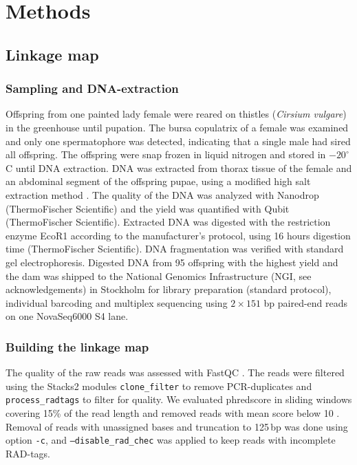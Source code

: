 \documentclass[twocolumn]{bmcart}%
\begin{document}
\section*{Methods}
\subsection*{Linkage map}
\subsubsection*{Sampling and DNA-extraction}
Offspring from one painted lady female were reared on thistles (\textit{Cirsium vulgare}) in the greenhouse until pupation. The bursa copulatrix of a female was examined and only one spermatophore was detected, indicating that a single male had sired all offspring. The offspring were snap frozen in liquid nitrogen and stored in $-20^\circ$C until DNA extraction. DNA was extracted from thorax tissue of the female and an abdominal segment of the offspring pupae, using a modified high salt extraction method \citep{aljanabiUniversalRapidSaltextraction1997}. The quality of the DNA was analyzed with Nanodrop (ThermoFischer Scientific) and the yield was quantified with Qubit (ThermoFischer Scientific). Extracted DNA was digested with the restriction enzyme EcoR1 according to the manufacturer's protocol, using 16 hours digestion time (ThermoFischer Scientific). DNA fragmentation was verified with standard gel electrophoresis. Digested DNA from 95 offspring with the highest yield and the dam was shipped to the National Genomics Infrastructure (NGI, see acknowledgements) in Stockholm for library preparation (standard protocol), individual barcoding and multiplex sequencing using $2\times151$ bp paired-end reads on one NovaSeq6000 S4 lane.

\subsubsection*{Building the linkage map} 
The quality of the raw reads was assessed with FastQC \citep{babrahambioinformaticsFastQCQualityControl2010}. The reads were filtered using the Stacks2 modules \texttt{clone\_filter} to remove PCR-duplicates and \texttt{process\_radtags} to filter for quality. We evaluated phredscore in sliding windows covering 15\% of the read length and removed reads with mean score below 10 \citep{catchenStacksAnalysisTool2013}. Removal of reads with unassigned bases and truncation to 125\,bp was done using option \texttt{-c}, and \texttt{--disable\_rad\_chec} was applied to keep reads with incomplete RAD-tags. 
\end{document}
